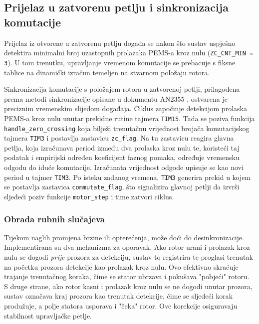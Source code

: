 \documentclass[diplomskirad]{fer}
\begin{document}
\subsection{Prijelaz u zatvorenu petlju i sinkronizacija komutacije}
\label{ssec:prijelaz_u_zatvorenu_petlju}

Prijelaz iz otvorene u zatvorenu petlju događa se nakon što sustav uspješno
detektira minimalni broj uzastopnih prolazaka PEMS-a kroz nulu
(\texttt{ZC\_CNT\_MIN = 3}). U tom trenutku, upravljanje vremenom komutacije se
prebacuje s fiksne tablice na dinamički izračun temeljen na stvarnom položaju
rotora.

Sinkronizacija komutacije s položajem rotora u zatvorenoj petlji, prilagođena
prema metodi sinkronizacije opisane u dokumentu AN2355 \cite{NXP_AN2355},
ostvarena je preciznim vremenskim slijedom događaja. Ciklus započinje
detekcijom prolaska PEMS-a kroz nulu unutar prekidne rutine tajmera
\texttt{TIM15}. Tada se poziva funkcija \texttt{handle\_zero\_crossing} koja
bilježi trenutačnu vrijednost brojača komutacijskog tajmera \texttt{TIM3} i
postavlja zastavicu \texttt{zc\_flag}. Na tu zastavicu reagira glavna petlja,
koja izračunava period između dva prolaska kroz nulu te, koristeći taj podatak
i empirijski određen koeficijent faznog pomaka, određuje vremensku odgodu do
iduće komutacije. Izračunata vrijednost odgode upisuje se kao novi period u
tajmer \texttt{TIM3}. Po isteku zadanog vremena, \texttt{TIM3} generira prekid
u kojem se postavlja zastavica \texttt{commutate\_flag}, što signalizira
glavnoj petlji da izvrši sljedeći poziv funkcije \texttt{motor\_step} i time
zatvori ciklus.


\subsubsection{Obrada rubnih slučajeva}
\label{sssec:rubni_slucajevi}

Tijekom naglih promjena brzine ili opterećenja, može doći do desinkronizacije.
Implementirana su dva mehanizma za oporavak. Ako rotor urani i prolazak kroz
nulu se dogodi \textit{prije} prozora za detekciju, sustav to registrira te
proglasi trenutak na početku prozora detekcije kao prolazak kroz nulu. Ovo
efektivno skraćuje trajanje trenutačnog koraka, čime se stator ubrzava i
pokušava "pobjeći" rotoru. S druge strane, ako rotor kasni i prolazak kroz nulu
se ne dogodi unutar prozora, sustav označava kraj prozora kao trenutak
detekcije, čime se sljedeći korak produžuje, a polje statora usporava i "čeka"
rotor. Ove korekcije osiguravaju stabilnost upravljačke petlje.
\end{document}
